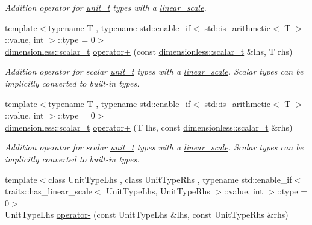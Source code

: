 \begin{DoxyCompactItemize}
\begin{DoxyCompactList}\small\item\em Addition operator for \hyperlink{classunits_1_1unit__t}{unit\+\_\+t} types with a \hyperlink{structunits_1_1linear__scale}{linear\+\_\+scale}. \end{DoxyCompactList}\item 
\hypertarget{namespaceunits_ab37cafc17a3e78f576c4641015be1f5e}{}{\footnotesize template$<$typename T , typename std\+::enable\+\_\+if$<$ std\+::is\+\_\+arithmetic$<$ T $>$\+::value, int $>$\+::type  = 0$>$ }\\\hyperlink{classunits_1_1unit__t}{dimensionless\+::scalar\+\_\+t} \hyperlink{namespaceunits_ab37cafc17a3e78f576c4641015be1f5e}{operator+} (const \hyperlink{classunits_1_1unit__t}{dimensionless\+::scalar\+\_\+t} \&lhs, T rhs)\label{namespaceunits_ab37cafc17a3e78f576c4641015be1f5e}

\begin{DoxyCompactList}\small\item\em Addition operator for scalar \hyperlink{classunits_1_1unit__t}{unit\+\_\+t} types with a \hyperlink{structunits_1_1linear__scale}{linear\+\_\+scale}. Scalar types can be implicitly converted to built-\/in types. \end{DoxyCompactList}\item 
\hypertarget{namespaceunits_a185958a6c867e29f7fca92d28922addd}{}{\footnotesize template$<$typename T , typename std\+::enable\+\_\+if$<$ std\+::is\+\_\+arithmetic$<$ T $>$\+::value, int $>$\+::type  = 0$>$ }\\\hyperlink{classunits_1_1unit__t}{dimensionless\+::scalar\+\_\+t} \hyperlink{namespaceunits_a185958a6c867e29f7fca92d28922addd}{operator+} (T lhs, const \hyperlink{classunits_1_1unit__t}{dimensionless\+::scalar\+\_\+t} \&rhs)\label{namespaceunits_a185958a6c867e29f7fca92d28922addd}

\begin{DoxyCompactList}\small\item\em Addition operator for scalar \hyperlink{classunits_1_1unit__t}{unit\+\_\+t} types with a \hyperlink{structunits_1_1linear__scale}{linear\+\_\+scale}. Scalar types can be implicitly converted to built-\/in types. \end{DoxyCompactList}\item 
\hypertarget{namespaceunits_ad741c4cf191609a83e6301dcab5af401}{}{\footnotesize template$<$class Unit\+Type\+Lhs , class Unit\+Type\+Rhs , typename std\+::enable\+\_\+if$<$ traits\+::has\+\_\+linear\+\_\+scale$<$ Unit\+Type\+Lhs, Unit\+Type\+Rhs $>$\+::value, int $>$\+::type  = 0$>$ }\\Unit\+Type\+Lhs \hyperlink{namespaceunits_ad741c4cf191609a83e6301dcab5af401}{operator-\/} (const Unit\+Type\+Lhs \&lhs, const Unit\+Type\+Rhs \&rhs)\label{namespaceunits_ad741c4cf191609a83e6301dcab5af401}


\end{DoxyCompactItemize}
